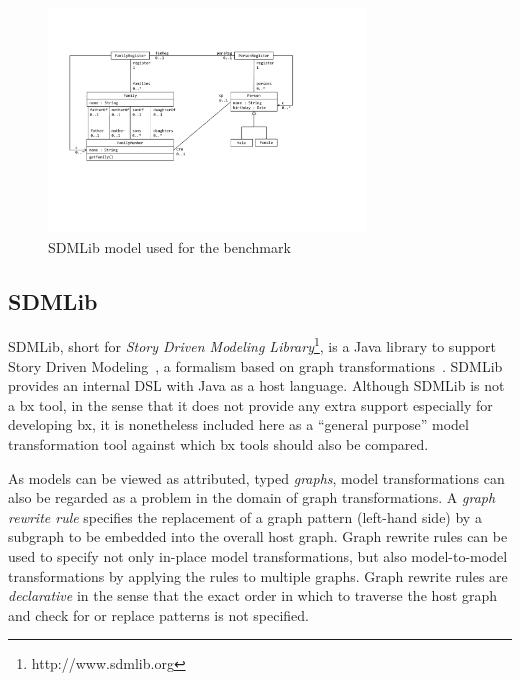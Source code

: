 

\begin{figure}[htb!]
	\centering
	\includegraphics[width=0.75\textwidth]{diagrams/solutions/SDMLibModel}
	\caption{SDMLib model used for the benchmark}
	\label{fig:SDMLibModel}
\end{figure}

\subsection{SDMLib}
\label{sec:SDMLib}


SDMLib, short for \emph{Story Driven Modeling Library}\footnote{http://www.sdmlib.org}, is a Java library to support Story Driven Modeling~\cite{Norbisrath2013}, a formalism based on graph transformations~\cite{Ehrig2006}.
SDMLib provides an internal DSL with Java as a host language.
Although SDMLib is not a bx tool, in the sense that it does not provide any extra support especially for developing bx, it is nonetheless included here as a ``general purpose'' model transformation tool against which bx tools should also be compared. 

As models can be viewed as attributed, typed \emph{graphs}, model transformations can also be regarded as a problem in the domain of graph transformations.
A \emph{graph rewrite rule} specifies the replacement of a graph pattern (left-hand side) by a subgraph to be embedded into the overall host graph.
Graph rewrite rules can be used to specify not only in-place model transformations, but also 
model-to-model transformations by applying the rules to multiple graphs.
Graph rewrite rules are \emph{declarative} in the sense that the exact order in which to traverse the host graph and check for or replace patterns is not specified.


